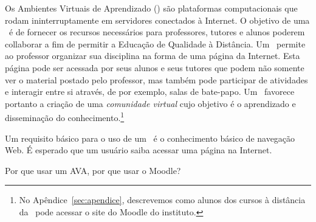 Os Ambientes Virtuais de Aprendizado (\avas) são plataformas computacionais que rodam ininterruptamente em servidores 
conectados à Internet. O objetivo de uma \ava\ é de fornecer os recursos necessários para professores, tutores 
e alunos poderem collaborar a fim de permitir a Educação de Qualidade à Distância. Um \ava\ permite ao 
professor organizar sua disciplina na forma
de uma página da Internet. Esta página pode ser acessada por seus alunos e seus tutores que podem não somente ver o 
material postado pelo professor, mas também pode participar de atividades e interagir entre si através, de 
por exemplo, salas de bate-papo. Um \ava\ favorece portanto a criação de uma \emph{comunidade virtual} cujo objetivo 
é o aprendizado e disseminação do conhecimento.\footnote{No Apêndice~\ref{sec:apendice}, 
descrevemos como alunos dos cursos à distância da \ufpb\ pode acessar o site do Moodle do instituto.}

Um requisito básico para o uso de um \ava\ é o conhecimento básico de navegação Web. É esperado que um usuário 
saiba acessar uma página na Internet. 

Por que usar um AVA, por que usar o Moodle?

